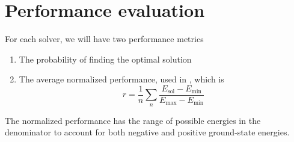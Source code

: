 \section{Performance evaluation}
For each solver, we will have two performance metrics 
\begin{enumerate}
    \item The probability of finding the optimal solution
    \item The average normalized performance, used in \cite{b34}, which is 
    \begin{equation}
        r = \frac{1}{n} \sum_n \frac{E_{\text{sol}} - E_{\min}}{E_{\max} - E_{\min}}
    \end{equation}
\end{enumerate}

The normalized performance has the range of possible energies in the denominator to account for both negative and positive ground-state energies. 